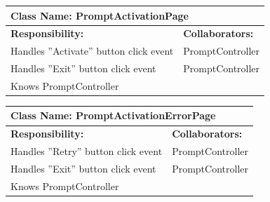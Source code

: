 \documentclass[]{article}
\begin{document}
	\begin{table}[H]
	\centering
	\begin{tabular}{|p{6cm}|p{6cm}|}
	\hline 
		\multicolumn{2}{|l|}{\textbf{Class Name: PromptActivationPage}} \\
	\hline
	\textbf{Responsibility:} & \textbf{Collaborators:} \\
	\hline
	Handles ”Activate” button click event & PromptController\\ \hline
	Handles ”Exit” button click event & PromptController\\ \hline
	Knows PromptController & \\ \hline
	\end{tabular}
	\end{table}
	
	\begin{table}[H]
	\centering
	\begin{tabular}{|p{6cm}|p{6cm}|}
	\hline 
		\multicolumn{2}{|l|}{\textbf{Class Name: PromptActivationErrorPage}} \\
	\hline
	\textbf{Responsibility:} & \textbf{Collaborators:} \\
	\hline
	Handles ”Retry” button click event & PromptController\\ \hline
	Handles ”Exit” button click event & PromptController\\ \hline
	Knows PromptController & \\ \hline
	\end{tabular}
	\end{table}
\end{document}
